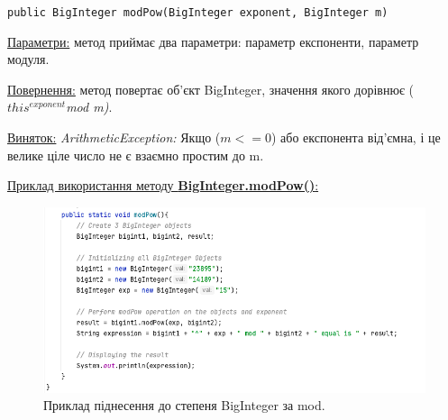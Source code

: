 \texttt{public BigInteger modPow(BigInteger exponent, BigInteger m)}

\uline{Параметри:} метод приймає два параметри: параметр експоненти, параметр модуля.

\uline{Повернення:} метод повертає об’єкт BigInteger, значення якого дорівнює ($this^{exponent}$\textit{mod m)}.

\uline{Виняток:} \textit{ArithmeticException:} Якщо ($m <= 0$) або експонента від’ємна, і це велике ціле число не є взаємно простим до m.

\uline{Приклад використання методу \textbf{BigInteger.modPow()}:}

\begin{figure}[h]
     \centering
     \includegraphics[scale = 0.6]{../IMAGES/Java/BigInt_modPow_ex.png}
     \caption{Приклад піднесення до степеня BigInteger за mod.}
     \label{fig_java_mPow1}
\end{figure}

